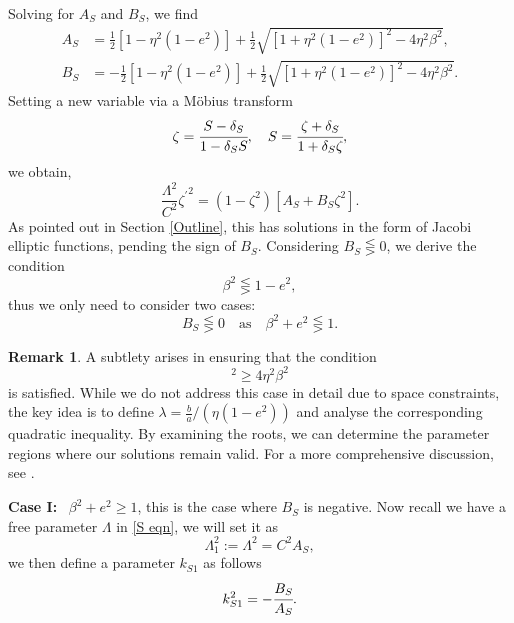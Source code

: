 \documentclass[12pt,oneside]{report}
\theoremstyle{definition}
\newtheorem{remark}{Remark}
\begin{document}
Solving for $A_{S}$ and $B_{S}$, we find
\begin{align}
    A_{S} &= \frac{1}{2}[1-\eta^{2}(1-e^{2})]+\frac{1}{2}\sqrt{[1+\eta^{2}(1-e^{2})]^{2}-4\eta^{2}\beta^{2}},\\
    B_{S} &= -\frac{1}{2}[1-\eta^{2}(1-e^{2})]+\frac{1}{2}\sqrt{[1+\eta^{2}(1-e^{2})]^{2}-4\eta^{2}\beta^{2}}.
\end{align}
Setting a new variable via a M\"obius transform
\begin{equation}
    \zeta = \cfrac{S-\delta_{S}}{1-\delta_{S}S} , \quad S= \cfrac{\zeta+\delta_{S}}{1+\delta_{S}\zeta},
\end{equation}
we obtain,
\begin{equation}\label{zeta}
    \frac{\Lambda^{2}}{C^{2}}{\zeta^{\prime}}^{2} = (1-\zeta^{2})[A_{S}+B_{S}\zeta^{2}].
\end{equation}
As pointed out in Section \ref{Outline}, this has solutions in the form of Jacobi elliptic functions, pending the sign of $B_{S}$. Considering $B_{S} \lesseqgtr 0$, we derive the condition
\begin{equation}
    \beta^{2} \lesseqgtr 1-e^{2},
\end{equation}
thus we only need to consider two cases:
\begin{equation}
    B_{S} \lesseqgtr 0  \quad \text{as} \quad \beta^{2}+e^{2} \lesseqgtr 1.
\end{equation}
\begin{remark}
    A subtlety arises in ensuring that the condition
    \begin{equation}
        [1+\eta^{2}(1-e^{2})]^{2} \geq 4\eta^{2}\beta^{2}
    \end{equation}
    is satisfied. While we do not address this case in detail due to space constraints, the key idea is to define $\lambda = \frac{b}{a}/(\eta(1-e^{2}))$ and analyse the corresponding quadratic inequality. By examining the roots, we can determine the parameter regions where our solutions remain valid. For a more comprehensive discussion, see \cite{o2008integrable}.
\end{remark}
\textbf{Case I:} \ $\beta^{2}+e^{2} \geq 1$,
this is the case where $B_{S}$ is negative. Now recall we have a free parameter $\Lambda$ in \autoref{S eqn}, we will set it as
\begin{equation}
    \Lambda_{1}^{2} := \Lambda^{2} = C^{2}A_{S}, 
\end{equation}
we then define a parameter $k_{S1}$ as follows
\begin{equation}
    k_{S1}^{2} = -\cfrac{B_{S}}{A_{S}}. 
\end{equation}
\end{document}
